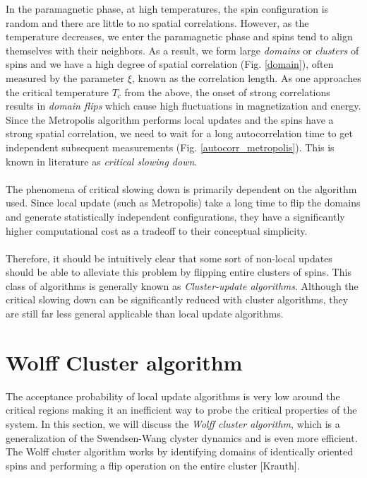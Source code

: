 \documentclass[../thesis_main.tex]{subfiles}
\begin{document}
\!\!\!In the paramagnetic phase, at high temperatures, the spin configuration is random and there are little to no spatial correlations. However, as the temperature decreases, we enter the paramagnetic phase and spins tend to align themselves with their neighbors. As a result, we form large \textit{domains} or \textit{clusters} of spins and we have a high degree of spatial correlation (Fig. \ref{domain}), often measured by the parameter $\xi$, known as the correlation length. As one approaches the critical temperature $T_c$ from the above, the onset of strong correlations results in \textit{domain flips} which cause high fluctuations in magnetization and energy. Since the Metropolis algorithm performs local updates and the spins have a strong spatial correlation, we need to wait for a long autocorrelation time to get independent subsequent measurements (Fig. \ref{autocorr_metropolis}). This is known in literature as \textit{critical slowing down}.~\\~\\
The phenomena of critical slowing down is primarily dependent on the algorithm used. Since local update (such as Metropolis) take a long time to flip the domains and generate statistically independent configurations, they have a significantly higher computational cost as a tradeoff to their conceptual simplicity.~\\~\\
Therefore, it should be intuitively clear that some sort of non-local updates should be able to alleviate this problem by flipping entire clusters of spins. This class of algorithms is generally known as \textit{Cluster-update algorithms}. Although the critical slowing down can be significantly reduced with cluster algorithms, they are still far less general applicable than local update algorithms.

\section{Wolff Cluster algorithm}
The acceptance probability of local update algorithms is very low around the critical regions making it an inefficient way to probe the critical properties of the system. In this section, we will discuss the \textit{Wolff cluster algorithm}, which is a generalization of the Swendsen-Wang clyster dynamics and is even more efficient. The Wolff cluster algorithm works by identifying domains of identically oriented spins and performing a flip operation on the entire cluster [Krauth].
\end{document}
